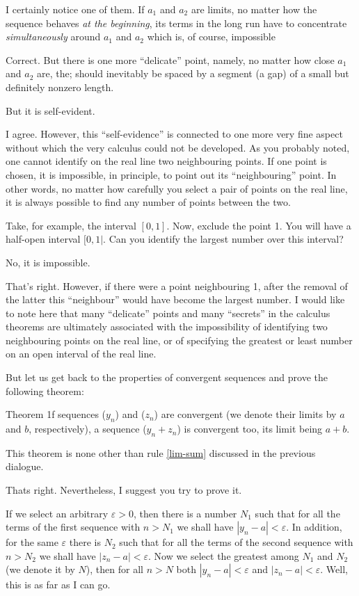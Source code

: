 {\rdr I certainly notice one of them. If $a_{1}$ and $a_{2}$ are limits, no matter how the sequence behaves \emph{at the beginning}, its terms in the long run have to concentrate \emph{simultaneously} around $a_{1}$ and $a_{2}$ which is, of course, impossible

\athr Correct. But there is one more ``delicate'' point, namely, no matter how close $a_{1}$ and $a_{2}$ are, the; should inevitably be spaced by a segment (a gap) of a small but definitely nonzero length.

\rdr But it is self-evident.

\athr I agree. However, this ``self-evidence'' is connected to one more very fine aspect without which the very calculus could not be developed. As you probably noted, one cannot identify on the real line two neighbouring points. If one point is chosen, it is impossible, in principle, to point out its ``neighbouring'' point. In other words, no matter how carefully you select a pair of points on the real line, it is always possible to find any number of points between the two.

Take, for example, the interval $[0, 1]$. Now, exclude the point 1. You will have a half-open interval $[0, 1|$. Can you identify the largest number over this interval?

\rdr No, it is impossible.

\athr That's right. However, if there were a point neighbouring 1, after the removal of the latter this ``neighbour'' would have become the largest number. I would like to note here that many ``delicate'' points and many ``secrets'' in the calculus theorems are ultimately associated with the impossibility of identifying two neighbouring points on the real line, or of specifying the greatest or least 
number on an open interval of the real line.

But let us get back to the properties of convergent sequences and prove the following theorem:
\begin{mytheo}{Theorem}
1f sequences ($y_{n}$) and ($z_{n}$) are convergent (we denote their limits by $a$ and $b$, respectively), a sequence ($y_{n} + z_{n}$) is convergent too, its limit being $a + b$.
\end{mytheo}

\rdr This theorem is none other than rule \eqref{lim-sum} discussed in the	previous dialogue.

\athr Thats right. Nevertheless, I suggest you try to prove it.	

\rdr If we select an arbitrary $\varepsilon > 0$, then there is a number $N_{1}$ such that for all the terms of the first sequence with $n > N_{1}$ we shall have $| y_{n}- a | < \varepsilon$. In addition, for the same $\varepsilon$ there is $N_{2}$ such that for all the terms of the second sequence with $n > N_{2}$ we shall have $| z_{n}- a | < \varepsilon$. Now we select the greatest among $N_{1}$ and $N_{2}$ (we denote it by $N$), then for all $n > N$ both $| y_{n}- a | < \varepsilon$ and $| z_{n}- a | < \varepsilon$. Well, this is as far as I can go.

}
